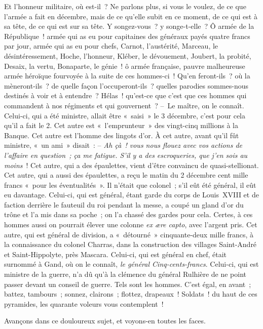 \documentclass[french,twoside]{book} %
\begin{document}
Et l’honneur militaire, où est-il ? Ne parlons plus, si vous le voulez, de ce que l’armée a fait en décembre, mais de ce qu’elle subit en ce moment, de ce qui est à sa tête, de ce qui est sur sa tête. Y songez-vous ? y songe-t-elle ? Ô armée de la République ! armée qui as eu pour capitaines des généraux payés quatre francs par jour, armée qui as eu pour chefs, Carnot, l’austérité, Marceau, le désintéressement, Hoche, l’honneur, Kléber, le dévouement, Joubert, la probité, Desaix, la vertu, Bonaparte, le génie ! ô armée française, pauvre malheureuse armée héroïque fourvoyée à la suite de ces hommes-ci ! Qu’en feront-ils ? où la mèneront-ils ? de quelle façon l’occuperont-ils ? quelles parodies sommes-nous destinés à voir et à entendre ? Hélas ! qu’est-ce que c’est que ces hommes qui commandent à nos régiments et qui gouvernent ? – Le maître, on le connaît. Celui-ci, qui a été ministre, allait être « saisi » le 3 décembre, c’est pour cela qu’il a fait le 2. Cet autre est « l’emprunteur » des vingt-cinq millions à la Banque. Cet autre est l’homme des lingots d’or. À cet autre, avant qu’il fût ministre, « un ami » disait : – \emph{Ah çà ! vous nous flouez avec vos actions de l’affaire en question ; ça me fatigue. S’il y a des escroqueries, que j’en sois au moins} ! Cet autre, qui a des épaulettes, vient d’être convaincu de quasi-stellionat. Cet autre, qui a aussi des épaulettes, a reçu le matin du 2 décembre cent mille francs « pour les éventualités ». Il n’était que colonel ; s’il eût été général, il eût eu davantage. Celui-ci, qui est général, étant garde du corps de Louis XVIII et de faction derrière le fauteuil du roi pendant la messe, a coupé un gland d’or du trône et l’a mis dans sa poche ; on l’a chassé des gardes pour cela. Certes, à ces hommes aussi on pourrait élever une colonne \emph{ex ære capto}, avec l’argent pris. Cet autre, qui est général de division, a « détourné » cinquante-deux mille francs, à la connaissance du colonel Charras, dans la construction des villages Saint-André et Saint-Hippolyte, près Mascara. Celui-ci, qui est général en chef, était surnommé à Gand, où on le connaît, \emph{le général Cinq-cents-francs}. Celui-ci, qui est ministre de la guerre, n’a dû qu’à la clémence du général Rulhière de ne point passer devant un conseil de guerre. Tels sont les hommes. C’est égal, en avant ; battez, tambours ; sonnez, clairons ; flottez, drapeaux ! Soldats ! du haut de ces pyramides, les quarante voleurs vous contemplent !\par
Avançons dans ce douloureux sujet, et voyons-en toutes les faces.\par
\end{document}
